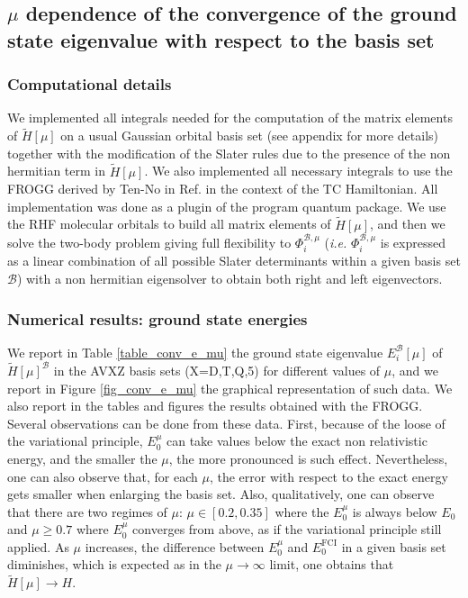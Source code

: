 \documentclass[aip,jcp,reprint,noshowkeys,superscriptaddress]{revtex4-1}
\newcommand{\phiimub}[0]{\Phi^{\mathcal{B},\mu}_i}
\newcommand{\basis}[0]{\mathcal{B}}
\begin{document}
\subsection{$\mu$ dependence of the convergence of the ground state eigenvalue with respect to the basis set }
\subsubsection{Computational details}
We implemented all integrals needed for the computation of the matrix elements of $\tilde{H}[\mu]$ on a usual Gaussian orbital basis set (see appendix for more details) together with the modification of the Slater rules due to the presence of the non hermitian term in $\tilde{H}[\mu]$. We also implemented all necessary integrals to use the FROGG derived by Ten-No in Ref.  in the context of the TC Hamiltonian.  
All implementation was done as a plugin of the program quantum package\cite{QP2}. 
We use the RHF molecular orbitals to build all matrix elements of $\tilde{H}[\mu]$, and then we solve the two-body problem giving full flexibility to $\phiimub$ (\textit{i.e.} $\phiimub$ is expressed as a linear combination of all possible Slater determinants within a given basis set $\basis$) with a non hermitian eigensolver to obtain both right and left eigenvectors. 

\subsubsection{Numerical results: ground state energies}
\label{sec:total_e}
We report in Table \ref{table_conv_e_mu} the ground state eigenvalue $E_i^{\basis}[\mu]$ of $\tilde{H}[\mu]^{\basis}$ in the AVXZ basis sets (X=D,T,Q,5) for different values of $\mu$, and we report in Figure \ref{fig_conv_e_mu} the graphical representation of such data. We also report in the tables and figures the results obtained with the FROGG. 
Several observations can be done from these data. First, because of the loose of the variational principle, $E_0^{\mu}$ can take values below the exact non relativistic energy, and the smaller the $\mu$, the more pronounced is such effect. 
Nevertheless, one can also observe that, for each $\mu$, the error with respect to the exact energy gets smaller  
when enlarging the basis set. Also, qualitatively, one can observe that there are two regimes of $\mu$: $\mu \in[0.2,0.35]$ where the $E_0^\mu$ is always below $E_0$ and $\mu\ge 0.7$ where $E_0^\mu$ converges from above, as if the variational principle still applied. 
As $\mu$ increases, the difference between $E_0^\mu$ and $E_0^\text{FCI}$ in a given basis set diminishes, 
which is expected as in the $\mu \rightarrow \infty$ limit, one obtains that  $\tilde{H}[\mu] \rightarrow H$. 
\end{document}

